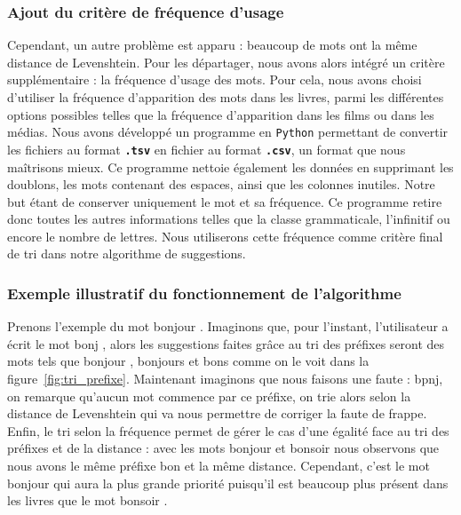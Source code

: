 \documentclass[a4paper, 11pt]{report}
\newcommand{\var}[1]{\texttt{\textbf{#1}}}
\newcommand{\langage}[1]{\texttt{#1}}
\begin{document}
{\subsubsection{Ajout du critère de fréquence d'usage}
Cependant, un autre problème est apparu : beaucoup de mots ont la même distance de Levenshtein. Pour les départager, nous avons alors intégré un critère supplémentaire : la fréquence d’usage des mots. Pour cela, nous avons choisi d’utiliser la fréquence d’apparition des mots dans les livres, parmi les différentes options possibles telles que la fréquence d'apparition dans les films ou dans les médias. Nous avons développé un programme en \langage{Python} permettant de convertir les fichiers au format \var{.tsv} en fichier au format \var{.csv}, un format que nous maîtrisons mieux. Ce programme nettoie également les données en supprimant les doublons, les mots contenant des espaces, ainsi que les colonnes inutiles. Notre but étant de conserver uniquement le mot et sa fréquence. Ce programme retire donc toutes les autres informations telles que la classe grammaticale, l’infinitif ou encore le nombre de lettres. Nous utiliserons cette fréquence comme critère final de tri dans notre algorithme de suggestions.


\subsubsection{Exemple illustratif du fonctionnement de l'algorithme}

Prenons l'exemple du mot \og{}bonjour \fg{}. Imaginons que, pour l'instant, l'utilisateur a écrit le mot \og{}bonj \fg{}, alors les suggestions faites grâce au tri des préfixes seront des mots tels que \og{}bonjour \fg{}, \og{}bonjours \fg{} et \og{}bons \fg{} comme on le voit dans la figure~\ref{fig:tri_prefixe}.
Maintenant imaginons que nous faisons une faute : \og{}bpnj\fg{}, on remarque qu'aucun mot commence par ce préfixe, on trie alors selon la distance de Levenshtein qui va nous permettre de corriger la faute de frappe. Enfin, le tri selon la fréquence permet de gérer le cas d'une égalité face au tri des préfixes et de la distance : avec les mots \og{}bonjour \fg{} et \og{}bonsoir \fg{} nous observons que nous avons le même préfixe \og{}bon \fg{} et la même distance. Cependant, c'est le mot \og{}bonjour \fg{} qui aura la plus grande priorité puisqu'il est beaucoup plus présent dans les livres que le mot \og{}bonsoir \fg{}.\\

}
\end{document}
